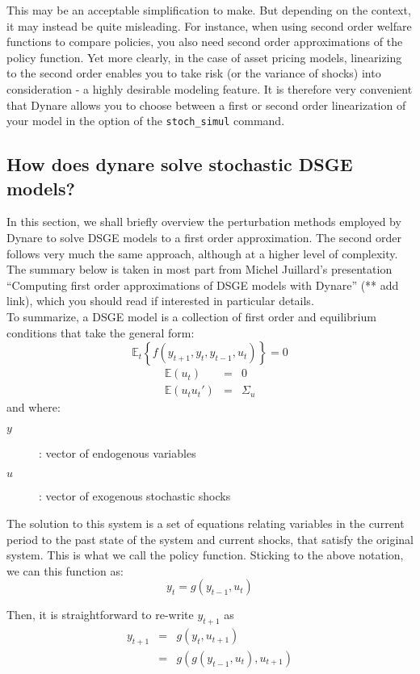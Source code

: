 This may be an acceptable simplification to make. But depending on the context, it may instead be quite misleading. For instance, when using second order welfare functions to compare policies, you also need second order approximations of the policy function. Yet more clearly, in the case of asset pricing models, linearizing to the second order enables you to take risk (or the variance of shocks) into consideration - a highly desirable modeling feature. It is therefore very convenient that Dynare allows you to choose between a first or second order linearization of your model in the option of the \texttt{stoch\_simul} command. \\

\subsection{How does dynare solve stochastic DSGE models?}
In this section, we shall briefly overview the perturbation methods employed by Dynare to solve DSGE models to a first order approximation. The second order follows very much the same approach, although at a higher level of complexity. The summary below is taken in most part from Michel Juillard's presentation ``Computing first order approximations of DSGE models with Dynare'' (** add link), which you should read if interested in particular details. \\

To summarize, a DSGE model is a collection of first order and equilibrium conditions that take the general form: 
\[
\mathbb{E}_t\left\{f(y_{t+1},y_t,y_{t-1},u_t)\right\}=0
\]
\begin{eqnarray*}
\mathbb{E}(u_t) &=& 0\\
\mathbb{E}(u_t u_t') &=& \Sigma_u
\end{eqnarray*}
and where:
\begin{description}
  \item[$y$]: vector of endogenous variables
  \item[$u$]: vector of exogenous stochastic shocks
\end{description}

The solution to this system is a set of equations relating variables in the current period to the past state of the system and current shocks, that satisfy the original system. This is what we call the policy function. Sticking to the above notation, we can this function as:
\[
y_t = g(y_{t-1},u_t)
\]

Then, it is straightforward to re-write $y_{t+1}$ as
\begin{eqnarray*}
  y_{t+1} &=& g(y_t,u_{t+1})\\
  &=& g(g(y_{t-1},u_t),u_{t+1})\\
\end{eqnarray*}

